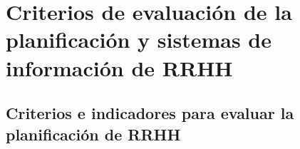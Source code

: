 %
%
%
%
%
%
%
%
%

\section{Criterios de evaluación de la planificación y sistemas de información de RRHH}

\subsection{Criterios e indicadores para evaluar la planificación de RRHH}

